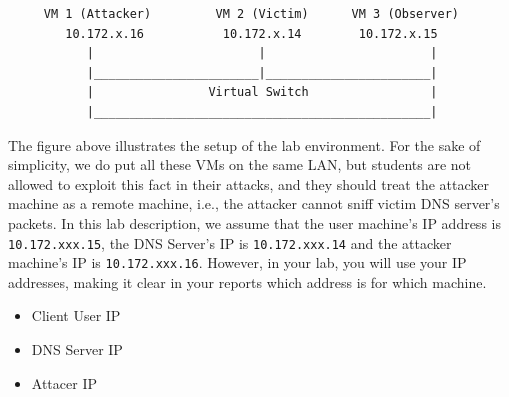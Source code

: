 \begin{verbatim}
     VM 1 (Attacker)         VM 2 (Victim)      VM 3 (Observer)
        10.172.x.16           10.172.x.14        10.172.x.15
           |                       |                       |
           |_______________________|_______________________|
           |                Virtual Switch                 |
           |_______________________________________________|
\end{verbatim}
\label{environment}

The figure above illustrates the setup of the lab environment. For the 
sake of simplicity, we do put all these VMs on the same LAN, but 
students are not allowed to exploit this fact in their attacks, and 
they should treat the attacker machine as a remote machine, 
i.e., the attacker cannot sniff victim DNS server's packets.
In this lab description, we assume that the user machine's IP address is {\tt 10.172.xxx.15}, 
the DNS Server's IP is {\tt 10.172.xxx.14} and the attacker machine's IP is {\tt 10.172.xxx.16}.
However, in your lab, you will use your IP addresses, making it clear in your reports which address is for which machine. 

\begin{itemize}
\item Client User IP \underline{\hspace{3cm}}
\item DNS Server IP \underline{\hspace{3cm}}
\item Attacer IP \underline{\hspace{3cm}}
\end{itemize}





